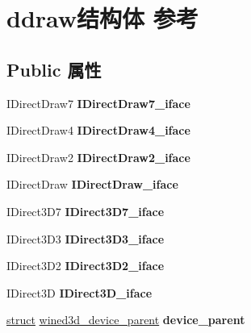 \hypertarget{structddraw}{}\section{ddraw结构体 参考}
\label{structddraw}
\subsection*{Public 属性}
\begin{DoxyCompactItemize}
\item 
\mbox{\label{structddraw_a2ca209535cdc7607baaa60a06da08d1b}} 
I\+Direct\+Draw7 {\bfseries I\+Direct\+Draw7\+\_\+iface}
\item 
\mbox{\label{structddraw_a622b3cb99732f1178480d44f1da956fb}} 
I\+Direct\+Draw4 {\bfseries I\+Direct\+Draw4\+\_\+iface}
\item 
\mbox{\label{structddraw_a134d371cd18d9af136010895fe77a2bf}} 
I\+Direct\+Draw2 {\bfseries I\+Direct\+Draw2\+\_\+iface}
\item 
\mbox{\label{structddraw_af56d7dad889a76519a89604db726b203}} 
I\+Direct\+Draw {\bfseries I\+Direct\+Draw\+\_\+iface}
\item 
\mbox{\label{structddraw_a9f5ef3a1186730679a2b83f6d809f2f3}} 
I\+Direct3\+D7 {\bfseries I\+Direct3\+D7\+\_\+iface}
\item 
\mbox{\label{structddraw_a140d4a7c02a76e741766f0d9ed8bd6ba}} 
I\+Direct3\+D3 {\bfseries I\+Direct3\+D3\+\_\+iface}
\item 
\mbox{\label{structddraw_ad02258327cdc287a86064936211860a4}} 
I\+Direct3\+D2 {\bfseries I\+Direct3\+D2\+\_\+iface}
\item 
\mbox{\label{structddraw_a3372ffff631215de15d30f113a17fa4c}} 
I\+Direct3D {\bfseries I\+Direct3\+D\+\_\+iface}
\item 
\mbox{\label{structddraw_ace92e9d16945476df78a13ca5299add8}} 
\hyperlink{interfacestruct}{struct} \hyperlink{structwined3d__device__parent}{wined3d\+\_\+device\+\_\+parent} {\bfseries device\+\_\+parent}
\item 

\end{DoxyCompactItemize}
